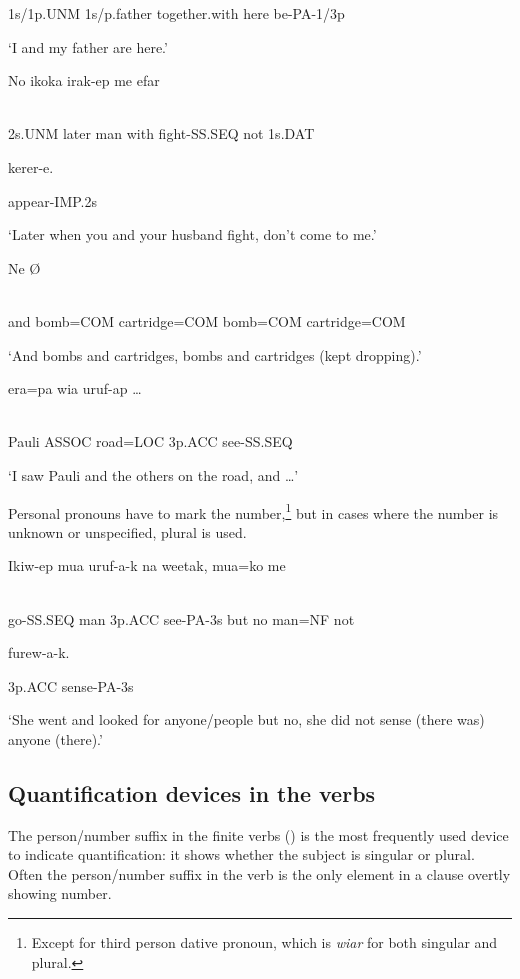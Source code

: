 1s/1p.UNM  1s/p.father  together.with  here  be-PA-1/3p

`I and my father are here.'

\ea%
\label{ex:x1293}
\gll No  ikoka    irak-ep  me  efar  \\
      \\
\glt
\z

2s.UNM  later  man  with  fight-SS.SEQ  not  1s.DAT

kerer-e.

appear-IMP.2s

`Later when you and your husband fight, don't come to me.'

\ea%
\label{ex:x1294}
\gll Ne   {\O} \\
      \\
\glt
\z

and  bomb=COM  cartridge=COM  bomb=COM  cartridge=COM

 `And bombs and cartridges, bombs and cartridges (kept dropping).'

\ea%
\label{ex:x1295}
\gll {}  era=pa  wia  uruf-ap  {\dots} \\
      \\
\glt
\z

Pauli  ASSOC  road=LOC  3p.ACC  see-SS.SEQ

`I saw Pauli and the others on the road, and {\dots}'

Personal pronouns have to mark the number,\footnote{Except for third person dative pronoun, which is \textit{wiar} for both singular and plural.} but in cases where the number is unknown or unspecified, plural is used.

\ea%
\label{ex:x1309}
\gll Ikiw-ep  mua    uruf-a-k  na  weetak,  mua=ko  me  \\
      \\
\glt
\z

go-SS.SEQ  man  3p.ACC  see-PA-3s  but  no  man=NF  not

  furew-a-k.

3p.ACC  sense-PA-3s

`She went and looked for anyone/people but no, she did not sense (there was) anyone (there).'

\subsection{Quantification devices in the verbs}
\hypertarget{RefHeading22601935131865}{}
The person/number suffix in the finite verbs () is the most frequently used device to indicate quantification: it shows whether the subject is singular or plural. Often the person/number suffix in the verb is the only element in a clause overtly showing number. 

